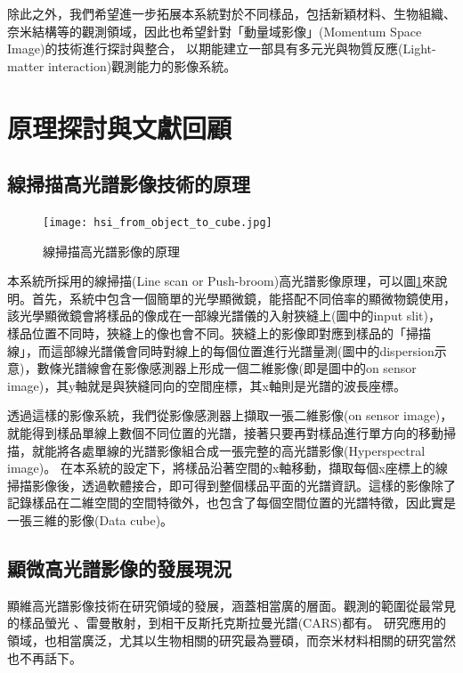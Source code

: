 \documentclass[12pt]{article}
\begin{document}
除此之外，我們希望進一步拓展本系統對於不同樣品，包括新穎材料、生物組織、奈米結構等的觀測領域，因此也希望針對「動量域影像」(Momentum Space Image)的技術進行探討與整合，
以期能建立一部具有多元光與物質反應(Light-matter interaction)觀測能力的影像系統。

\section{原理探討與文獻回顧}
\subsection{線掃描高光譜影像技術的原理}
\begin{figure}[h]
    \centering
    \texttt{[image: hsi\_from\_object\_to\_cube.jpg]}
    \caption{線掃描高光譜影像的原理}
    \label{fromObjecttoCube}
\end{figure}
本系統所採用的線掃描(Line scan or Push-broom)高光譜影像原理，可以圖\ref{fromObjecttoCube}來說明。首先，系統中包含一個簡單的光學顯微鏡，能搭配不同倍率的顯微物鏡使用，該光學顯微鏡會將樣品的像成在一部線光譜儀的入射狹縫上(圖中的input slit)，
樣品位置不同時，狹縫上的像也會不同。狹縫上的影像即對應到樣品的「掃描線」，而這部線光譜儀會同時對線上的每個位置進行光譜量測(圖中的dispersion示意)，數條光譜線會在影像感測器上形成一個二維影像(即是圖中的on sensor image)，其y軸就是與狹縫同向的空間座標，其x軸則是光譜的波長座標。

透過這樣的影像系統，我們從影像感測器上擷取一張二維影像(on sensor image)，就能得到樣品單線上數個不同位置的光譜，接著只要再對樣品進行單方向的移動掃描，就能將各處單線的光譜影像組合成一張完整的高光譜影像(Hyperspectral image)。
在本系統的設定下，將樣品沿著空間的x軸移動，擷取每個x座標上的線掃描影像後，透過軟體接合，即可得到整個樣品平面的光譜資訊。這樣的影像除了記錄樣品在二維空間的空間特徵外，也包含了每個空間位置的光譜特徵，因此實是一張三維的影像(Data cube)。

\subsection{顯微高光譜影像的發展現況}
顯維高光譜影像技術在研究領域的發展，涵蓋相當廣的層面。觀測的範圍從最常見的樣品螢光
、雷曼散射，到相干反斯托克斯拉曼光譜(CARS)都有\cite{roth2015hyperspectral,zhang2013quantitative, pegoraro2014hyperspectral}。
研究應用的領域，也相當廣泛，尤其以生物相關的研究最為豐碩\cite{leavesley2012hyperspectral,studer2012compressive}，而奈米材料相關的研究當然也不再話下\cite{roth2015hyperspectral}。
\end{document}
